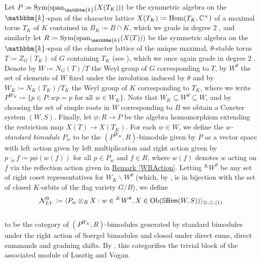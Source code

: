 \noindent %
Let $P \coloneqq \textup{Sym}(\textup{span}_\mathbbm{k}(X(T_K)))$ be the symmetric algebra on the $\mathbbm{k}$-span of the character lattice $X(T_K) \coloneqq \textup{Hom}(T_K, \mathbb{C}^\times)$ of a maximal torus $T_K$ of $K$ contained in $B_K \coloneqq B \cap K$, which we grade in degree $2$%
, and similarly let $R \coloneqq \textup{Sym}(\textup{span}_\mathbbm{k}(X(T)))$ be the symmetric algebra on the $\mathbbm{k}$-span of the character lattice of the unique maximal, $\theta$-stable torus $T \coloneqq Z_G(T_K)$ of $G$ containing $T_K$ (see \cite[Lemma 6.1.2]{LR22}), which we once again grade in degree $2$%
. Denote by $W \coloneqq N_G(T)/T$ the Weyl group of $G$ corresponding to $T$, by $W^\theta$ the set of elements of $W$ fixed under the involution induced by $\theta$ and by $W_K \coloneqq N_K(T_K)/T_K$ the Weyl group of $K$ corresponding to $T_K$, where we write $P^{W_K} \coloneqq \{p \in P : wp = p\text{ for all }w \in W_K\}$. Note that $W_K \subseteq W^\theta \subseteq W$, and by choosing the set of simple roots in $W$ corresponding to $B$ we obtain a Coxeter system $(W, S)$. Finally, let $\phi : R \to P$ be the algebra homomorphism extending the restriction map $X(T) \to X(T_K)$. For each $w \in W$, we define the {\em $w$-standard bimodule} $P_w$ to be the $(P^{W_K}, R)$-bimodule given by $P$ as a vector space with left action given by left multiplication and right action given by $p\cdot_w f \coloneqq p\phi(w(f))$ for all $p \in P_w$ and $f \in R$, where $w(f)$ denotes $w$ acting on $f$ via the reflection action given in \hyperref[WRAction]{Remark \ref*{WRAction}}. Letting ${}^KW^\theta$ be any set of right coset representatives for $W_K\backslash W^\theta$ (which, by \cite[Corollary 6.1.6]{LR22}, is in bijection with the set of closed $K$-orbits of the flag variety $G/B$), we define\\[-1.2\linespacing]
\begin{align*}
\begin{split}
\mathcal{N}_{LV}^0 \coloneqq \langle P_w \otimes_R X : w \in {}^KW^\theta, X \in \textup{Ob}(\mathbb{S}\textup{\textsf{Bim}}(W, S))\rangle_{\oplus,\ominus,(1)}
\end{split}
\end{align*}
\noindent\\[-1.2\linespacing] to be the category of $(P^{W_K}, R)$-bimodules generated by standard bimodules under the right action of Soergel bimodules and closed under direct sums, direct summands and gradning shifts. By \cite[Theorem 1.3.1]{LR22}, this categorifies the trivial block of the associated module of Lusztig and Vogan.\\


